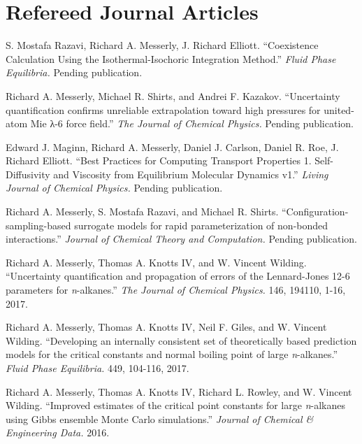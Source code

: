 \documentclass[12pt]{article}
\begin{document}

\section*{Refereed Journal Articles}

\begin{etaremune}

\item S. Mostafa Razavi, Richard A. Messerly, J. Richard Elliott. ``Coexistence Calculation Using the Isothermal-Isochoric Integration Method.'' \textit{Fluid Phase Equilibria.} Pending publication.

\item Richard A. Messerly, Michael R. Shirts, and Andrei F. Kazakov. ``Uncertainty quantification confirms unreliable extrapolation toward high pressures for united-atom Mie λ-6 force field.'' \textit{The Journal of Chemical Physics.} Pending publication.

\item Edward J. Maginn, Richard A. Messerly, Daniel J. Carlson, Daniel R. Roe, J. Richard Elliott. ``Best Practices for Computing Transport Properties 1. Self-Diffusivity and Viscosity from Equilibrium Molecular Dynamics v1.'' \textit{Living Journal of Chemical Physics.} Pending publication.
	
\item Richard A. Messerly, S. Mostafa Razavi, and Michael R. Shirts. ``Configuration-sampling-based surrogate models for rapid parameterization of non-bonded interactions.'' \textit{Journal of Chemical Theory and Computation.} Pending publication.
	
\item Richard A. Messerly, Thomas A. Knotts IV, and W. Vincent Wilding. ``Uncertainty quantification and propagation of errors of the Lennard-Jones 12-6 parameters for \textit{n}-alkanes.'' \textit{The Journal of Chemical Physics.} 146, 194110, 1-16, 2017.

\item Richard A. Messerly, Thomas A. Knotts IV, Neil F. Giles, and W. Vincent Wilding. ``Developing an internally consistent set of theoretically based prediction models for the critical constants and normal boiling point of large \textit{n}-alkanes.'' \textit{Fluid Phase Equilibria.} 449, 104-116, 2017.

\item Richard A. Messerly, Thomas A. Knotts IV, Richard L. Rowley, and W. Vincent Wilding. ``Improved estimates of the critical point constants for large \textit{n}-alkanes using Gibbs ensemble Monte Carlo simulations.'' \textit{Journal of Chemical \& Engineering Data.} 2016.


\end{etaremune}
\end{document}
